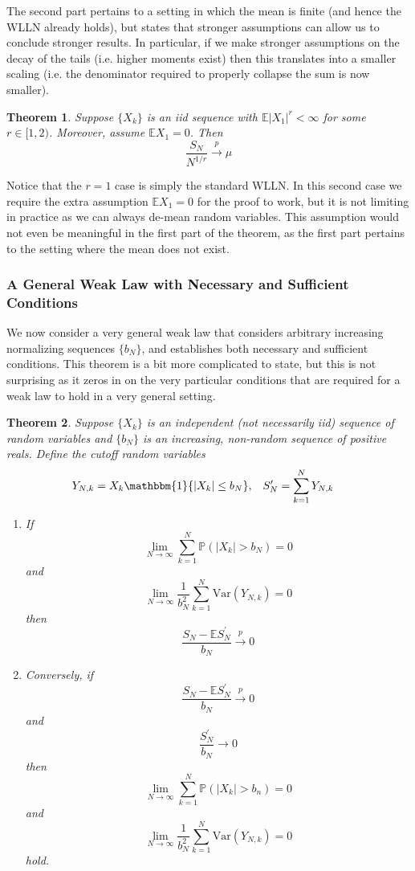 \documentclass[12pt]{article}
\newcommand*{\abs}[1]{\left\lvert#1\right\rvert}
\newcommand{\E}{\mathbb{E}}
\newcommand{\Var}{\mathrm{Var}}
\newcommand{\Prob}{\mathbb{P}}
\newtheorem{thm}{Theorem}
\begin{document}
The second part pertains to a setting in which the mean is finite (and hence the WLLN already holds), but states that stronger assumptions can allow us to conclude stronger results. 
In particular, if we make stronger assumptions 
on the decay of the tails (i.e. higher moments exist) then this translates into a smaller scaling (i.e. the denominator required to properly collapse the sum is now smaller). 
\begin{thm} 
Suppose $\{X_k\}$ is an iid sequence with $\E\abs{X_1}^r < \infty$ for some $r \in [1, 2)$. Moreover, assume $\E X_1 = 0$. Then 
\[\frac{S_N}{N^{1/r}} \overset{p}{\to} \mu\]
\end{thm}
Notice that the $r = 1$ case is simply the standard WLLN. In this second case we require the extra assumption $\E X_1 = 0$ for the proof to work, but it is not limiting in practice as we can 
always de-mean random variables. This assumption would not even be meaningful in the first part of the theorem, as the first part pertains to the setting where the mean does not exist. 

\subsubsection{A General Weak Law with Necessary and Sufficient Conditions}
We now consider a very general weak law that considers arbitrary increasing normalizing sequences $\{b_N\}$, and establishes both necessary and sufficient conditions. This theorem is a bit 
more complicated to state, but this is not surprising as it zeros in on the very particular conditions that are required for a weak law to hold in a very general setting. 
\begin{thm}
Suppose $\{X_k\}$ is an independent (not necessarily iid) sequence of random variables and $\{b_N\}$ is an increasing, non-random sequence of positive reals. Define the cutoff random variables 
\begin{align*}
&Y_{N, k} = X_k \mathbbm{1}\{\abs{X_k} \leq b_N\}, &&S_N^\prime = \sum_{k = 1}^{N} Y_{N, k}
\end{align*}
\begin{enumerate}
\item If
\[\lim_{N \to \infty} \sum_{k = 1}^{N} \Prob(\abs{X_k} > b_N) = 0\]
and 
\[\lim_{N \to \infty} \frac{1}{b_N^2} \sum_{k = 1}^{N} \Var(Y_{N, k}) = 0\]
then
\[\frac{S_N - \E S_N^\prime}{b_N} \overset{p}{\to} 0\]

\item Conversely, if 
\[\frac{S_N - \E S_N^\prime}{b_N} \overset{p}{\to} 0\]
and 
\[\frac{S_N^\prime}{b_N} \to 0\]
then 
\[\lim_{N \to \infty} \sum_{k = 1}^{N} \Prob(\abs{X_k} > b_n) = 0\]
and 
\[\lim_{N \to \infty} \frac{1}{b_N^2} \sum_{k = 1}^{N} \Var(Y_{N, k}) = 0\]
hold. 
\end{enumerate}
\end{thm}
\end{document}
